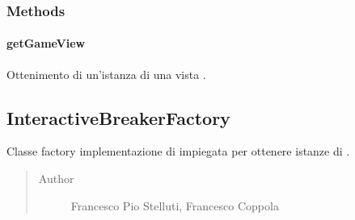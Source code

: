 \documentclass[letterpaper,10pt,italian,openany,oneside]{sphinxmanual}
\begin{document}
\subsubsection{Methods}
\label{\detokenize{test/it/unicam/cs/pa/mastermind/factories/GameViewFactory:methods}}

\paragraph{getGameView}
\label{\detokenize{test/it/unicam/cs/pa/mastermind/factories/GameViewFactory:getgameview}}

\begin{fulllineitems}
\label{\detokenize{test/it/unicam/cs/pa/mastermind/factories/GameViewFactory:it.unicam.cs.pa.mastermind.factories.GameViewFactory.getGameView()}}
Ottenimento di un’istanza di una vista .

\end{fulllineitems}



\subsection{InteractiveBreakerFactory}
\label{\detokenize{test/it/unicam/cs/pa/mastermind/factories/InteractiveBreakerFactory:interactivebreakerfactory}}\label{\detokenize{test/it/unicam/cs/pa/mastermind/factories/InteractiveBreakerFactory::doc}}

\begin{fulllineitems}
\label{\detokenize{test/it/unicam/cs/pa/mastermind/factories/InteractiveBreakerFactory:it.unicam.cs.pa.mastermind.factories.InteractiveBreakerFactory}}
Classe factory implementazione di  impiegata per ottenere istanze di .
\begin{quote}\begin{description}
\item[{Author}] \leavevmode
Francesco Pio Stelluti, Francesco Coppola

\end{description}\end{quote}

\end{fulllineitems}
\end{document}
